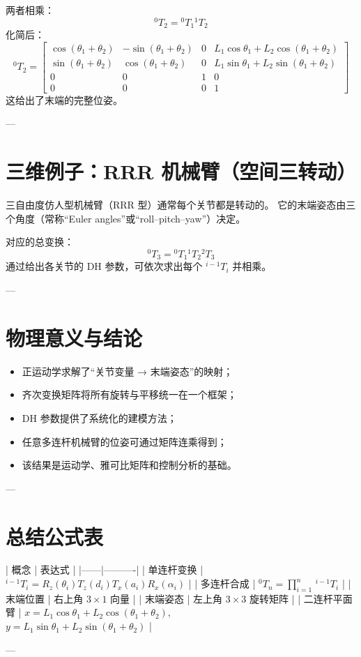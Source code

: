 \documentclass[12pt,a4paper]{article}
\begin{document}
两者相乘：
\[
^{0}T_2 = {^{0}T_1}{^{1}T_2}
\]
化简后：
\[
^{0}T_2 =
\begin{bmatrix}
\cos(\theta_1+\theta_2) & -\sin(\theta_1+\theta_2) & 0 & L_1\cos\theta_1 + L_2\cos(\theta_1+\theta_2)\\
\sin(\theta_1+\theta_2) & \cos(\theta_1+\theta_2) & 0 & L_1\sin\theta_1 + L_2\sin(\theta_1+\theta_2)\\
0 & 0 & 1 & 0\\
0 & 0 & 0 & 1
\end{bmatrix}
\]
这给出了末端的完整位姿。

---

\section{三维例子：RRR 机械臂（空间三转动）}
三自由度仿人型机械臂（RRR 型）通常每个关节都是转动的。  
它的末端姿态由三个角度（常称“Euler angles”或“roll–pitch–yaw”）决定。

对应的总变换：
\[
^{0}T_3 = {^{0}T_1}{^{1}T_2}{^{2}T_3}
\]
通过给出各关节的 DH 参数，可依次求出每个 $^{i-1}T_i$ 并相乘。

---

\section{物理意义与结论}
\begin{itemize}
  \item 正运动学求解了“关节变量 → 末端姿态”的映射；
  \item 齐次变换矩阵将所有旋转与平移统一在一个框架；
  \item DH 参数提供了系统化的建模方法；
  \item 任意多连杆机械臂的位姿可通过矩阵连乘得到；
  \item 该结果是运动学、雅可比矩阵和控制分析的基础。
\end{itemize}

---

\section{总结公式表}

| 概念 | 表达式 |
|------|----------|
| 单连杆变换 | \(^{i-1}T_i = R_z(\theta_i)T_z(d_i)T_x(a_i)R_x(\alpha_i)\) |
| 多连杆合成 | \(^{0}T_n = \prod_{i=1}^n\,^{i-1}T_i\) |
| 末端位置 | 右上角 \(3\times1\) 向量 |
| 末端姿态 | 左上角 \(3\times3\) 旋转矩阵 |
| 二连杆平面臂 | \(x=L_1\cos\theta_1+L_2\cos(\theta_1+\theta_2)\), \\ \(y=L_1\sin\theta_1+L_2\sin(\theta_1+\theta_2)\) |

---
\end{document}

